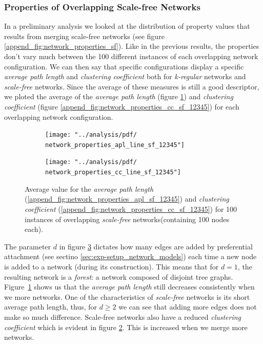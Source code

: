 \documentclass[preprint,number]{elsarticle}
\begin{document}
\subsubsection{Properties of Overlapping Scale-free Networks}
In a preliminary analysis we looked at the distribution of property values that results from merging scale-free networks (see figure \ref{append_fig:network_properties_sf}). Like in the previous results, the properties don't vary much between the 100 different instances of each overlapping network configuration. We can then say that specific configurations display a specific \textit{average path length} and \textit{clustering coefficient} both for \textit{k-regular} networks and \textit{scale-free} networks. Since the average of these measures is still a good descriptor, we ploted the average of the \textit{average path length} (figure \ref{fig:network_properties_apl_line_sf_12345}) and \textit{clustering coefficient} (figure \ref{append_fig:network_properties_cc_sf_12345}) for each overlapping network configuration.

\begin{figure}[H]
	\centering
	\begin{subfigure}{.5\linewidth}
		\centering
		\texttt{[image: "../analysis/pdf/ network\_properties\_apl\_line\_sf\_12345"]}
		\caption{}
		\label{fig:network_properties_apl_line_sf_12345}
	\end{subfigure}%
	\begin{subfigure}{.5\linewidth}
		\centering
		\texttt{[image: "../analysis/pdf/ network\_properties\_cc\_line\_sf\_12345"]}
		\caption{}
		\label{fig:network_properties_cc_line_sf_12345}
	\end{subfigure}
	\begin{minipage}{0.9\textwidth}
		\vspace{0.2cm}
		\caption{Average value for the \textit{average path length} (\ref{append_fig:network_properties_apl_sf_12345}) and \textit{clustering coefficient} (\ref{append_fig:network_properties_cc_sf_12345}) for 100 instances of overlapping \textit{scale-free} networks(containing 100 nodes each).}
		\label{fig:network_properties_line_sf}
	\end{minipage}
\end{figure}

The parameter $d$ in figure \ref{fig:network_properties_line_sf} dictates how many edges are added by preferential attachment (see sectino \ref{sec:exp-setup_network_models}) each time a new node is added to a network (during its construction). This means that for $d=1$, the resulting network is a \textit{forest}: a network composed of disjoint tree graphs. Figure~\ref{fig:network_properties_apl_line_sf_12345} shows us that the \textit{average path length} still decreases consistently when we more networks. One of the characteristics of \textit{scale-free} networks is its short average  path length, thus, for $d \ge 2$ we can see that adding more edges does not make so much difference. Scale-free networks also have a reduced \textit{clustering coefficient} which is evident in figure \ref{fig:network_properties_cc_line_sf_12345}. This is increased when we merge more networks.
\end{document}
